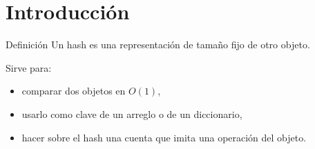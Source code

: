 \section{Introducción}

\begin{frame}{Definición}
  Un hash es una representación de tamaño fijo de otro objeto.

  \medskip
  Sirve para:
  \begin{itemize}
    \item comparar dos objetos en \(O(1)\),
    \item usarlo como clave de un arreglo o de un diccionario,
    \item hacer sobre el hash una cuenta que imita una operación del objeto.
  \end{itemize}
\end{frame}
